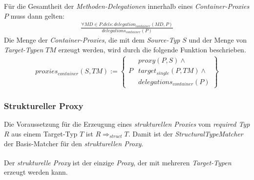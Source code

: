 \noindent
Für die Gesamtheit der \emph{Methoden-Delegationen} innerhalb eines \emph{Container-Proxies} $P$ muss dann gelten:
\begin{gather*}
\frac{\mathit{\forall \mathit{MD} \in P.dels: \mathit{delegation_{container}(MD,P)}}}
{\mathit{delegations_{container}(P)}}
\end{gather*}
\noindent
Die Menge der \emph{Container-Proxies}, die mit dem \emph{Source-Typ} $S$ und der Menge von \emph{Target-Typen} $\mathit{TM}$ erzeugt werden, wird durch die folgende Funktion beschrieben.
\begin{gather*}
\mathit{proxies_{container}(S,\mathit{TM})} := 
\left\{\begin{array}{l|l}
		& \mathit{proxy(P,S)}  \wedge \mathit{ } \\
	P	& \mathit{target_{single}(P,\mathit{TM})} \wedge \mathit{ } \\
		& \mathit{delegations_{container}(P)} 
		 \end{array}
\right\}
\end{gather*}
\subsubsection{Struktureller Proxy}\label{sssec_structproxy}
Die Voraussetzung für die Erzeugung eines \emph{strukturellen Proxies} vom \emph{required Typ} $R$ aus einem Target-Typ $T$ ist $R \Rightarrow_{struct} T$. Damit ist der \emph{StructuralTypeMatcher} der Basis-Matcher für den \emph{strukturellen Proxy}.
\\\\
Der \emph{strukturelle Proxy} ist der einzige \emph{Proxy}, der mit mehreren \emph{Target-Typen} erzeugt werden kann. 

